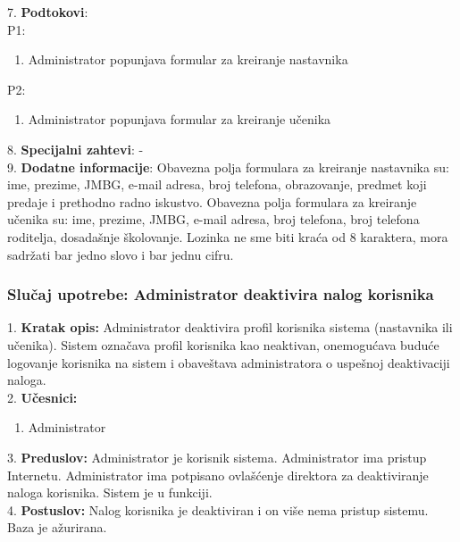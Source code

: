 \documentclass{article}
\begin{document}
7. \textbf{Podtokovi}: \\
P1:
\begin{enumerate} [label=(\alph*)]
\item Administrator popunjava formular za kreiranje nastavnika
\end{enumerate}
P2:
\begin{enumerate} [label=(\alph*)]
\item Administrator popunjava formular za kreiranje učenika
\end{enumerate}

8. \textbf{Specijalni zahtevi}: - \\

9. \textbf{Dodatne informacije}: Obavezna polja formulara za kreiranje nastavnika su: ime, prezime, JMBG, e-mail adresa, broj telefona, obrazovanje, predmet koji predaje i prethodno radno iskustvo. Obavezna polja formulara za kreiranje učenika su: ime, prezime, JMBG, e-mail adresa, broj telefona, broj telefona roditelja, dosadašnje školovanje. Lozinka ne sme biti kraća od 8 karaktera, mora sadržati bar jedno slovo i bar jednu cifru. \\

\subsubsection{Slučaj upotrebe: Administrator deaktivira nalog korisnika}
1. \textbf{Kratak opis:} Administrator deaktivira profil korisnika sistema (nastavnika ili učenika). Sistem označava profil korisnika kao neaktivan, onemogućava buduće logovanje korisnika na sistem i obaveštava administratora o uspešnoj deaktivaciji naloga. \\

2. \textbf{Učesnici:}
\begin{enumerate} [label=(\alph*)]
\item Administrator
\end{enumerate} 

3. \textbf{Preduslov:} Administrator je korisnik sistema. Administrator ima pristup Internetu. Administrator ima potpisano ovlašćenje direktora za deaktiviranje naloga korisnika. Sistem je u funkciji. \\

4. \textbf{Postuslov:} Nalog korisnika je deaktiviran i on više nema pristup sistemu. Baza je ažurirana. \\
\end{document}
